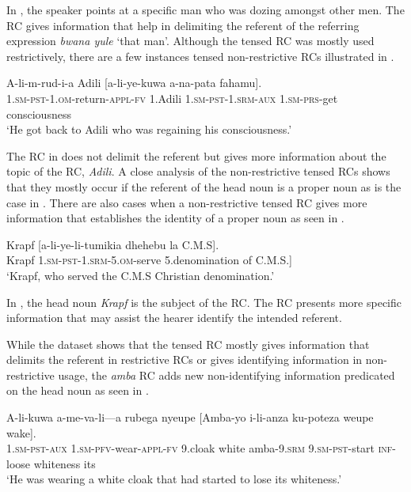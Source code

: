 \documentclass[output=paper,colorlinks,citecolor=brown]{langscibook}
\begin{document}
In , the speaker points at a specific man who was dozing amongst other men. The RC gives information that help in delimiting the referent of the referring expression \textit{bwana yule} ‘that man’. Although the tensed RC was mostly used restrictively, there are a few instances tensed non-restrictive RCs illustrated in .

\ea%
    \label{ex:mwamzandi:15}
    \gll    A-li-m-rud-i-a Adili [a-li-ye-kuwa a-na-pata fahamu].\\
            \textsc{1.sm-pst-1.om-}return\textsc{-appl-fv} 1.Adili \textsc{1.sm-pst-1.srm-aux} \textsc{1.sm-prs-}get consciousness\\
    \glt    ‘He got back to Adili who was regaining his consciousness.’
\z

The RC in  does not delimit the referent but gives more information about the topic of the RC, \textit{Adili}. A close analysis of the non-restrictive tensed RCs shows that they mostly occur if the referent of the head noun is a proper noun as is the case in . There are also cases when a non-restrictive tensed RC gives more information that establishes the identity of a proper noun as seen in .

\ea%
    \label{ex:mwamzandi:16}
    \gll    Krapf [a-li-ye-li-tumikia dhehebu la C.M.S].\\
            Krapf  \textsc{1.sm-pst-1.srm-5.om-}serve 5.denomination of C.M.S.]\\
    \glt    ‘Krapf, who served the C.M.S Christian denomination.’
\z

In , the head noun \textit{Krapf} is the subject of the RC. The RC presents more specific information that may assist the hearer identify the intended referent.

While the dataset shows that the tensed RC mostly gives information that delimits the referent in restrictive RCs or gives identifying information in non-restrictive usage, the \textit{amba} RC adds new non-identifying information predicated on the head noun as seen in .

\ea%
    \label{ex:mwamzandi:17}
    \gll    A-li-kuwa a-me-va-li—a rubega nyeupe [Amba-yo i-li-anza ku-poteza weupe wake].\\
            \textsc{1.sm-pst-aux} \textsc{1.sm-pfv-}wear\textsc{-appl-fv} 9.cloak white amba\textsc{-9.srm} \textsc{9.sm-pst-}start \textsc{inf-}loose whiteness its\\
    \glt    ‘He was wearing a white cloak that had started to lose its whiteness.’
\z
\end{document}
